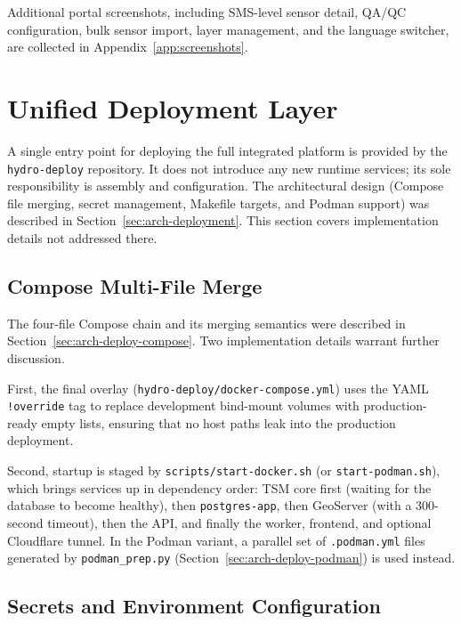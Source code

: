 Additional portal screenshots, including SMS-level sensor detail, QA/QC
configuration, bulk sensor import, layer management, and the language switcher,
are collected in Appendix~\ref{app:screenshots}.

\section{Unified Deployment Layer}
\label{sec:impl-deploy}

A single entry point for deploying the full integrated platform is provided by the \texttt{hydro-deploy} repository.
It does not introduce any new runtime services; its sole responsibility is assembly and configuration.
The architectural design (Compose file merging, secret management, Makefile targets, and
Podman support) was described in Section~\ref{sec:arch-deployment}. This section covers
implementation details not addressed there.

\subsection{Compose Multi-File Merge}
\label{sec:impl-deploy-compose}

The four-file Compose chain and its merging semantics were described in
Section~\ref{sec:arch-deploy-compose}. Two implementation details warrant further
discussion.

First, the final overlay (\texttt{hydro-deploy/docker-compose.yml}) uses the YAML
\texttt{!override} tag to replace development bind-mount volumes with production-ready
empty lists, ensuring that no host paths leak into the production deployment.

Second, startup is staged by \texttt{scripts/start-docker.sh} (or
\texttt{start-podman.sh}), which brings services up in dependency order: TSM core first
(waiting for the database to become healthy), then \texttt{postgres-app}, then GeoServer
(with a 300-second timeout), then the API, and finally the worker, frontend, and optional
Cloudflare tunnel. In the Podman variant, a parallel set of \texttt{.podman.yml} files
generated by \texttt{podman\_prep.py} (Section~\ref{sec:arch-deploy-podman}) is used
instead.

\subsection{Secrets and Environment Configuration}
\label{sec:impl-deploy-env}

